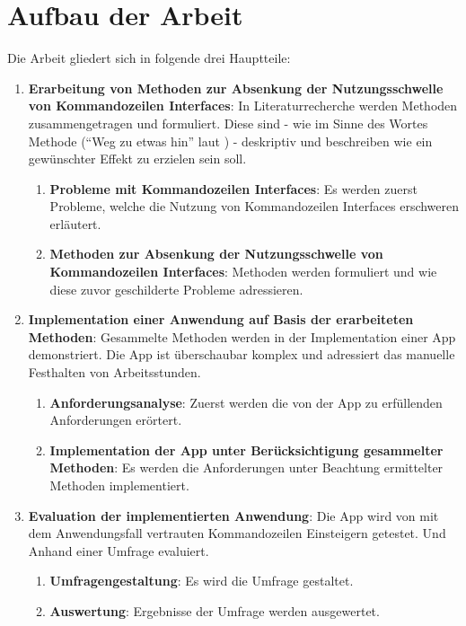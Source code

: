 \documentclass[oneside,bibliography=totocnumbered,BCOR=5mm]{scrbook}
\begin{document}
\section{Aufbau der Arbeit}

Die Arbeit gliedert sich in folgende drei Hauptteile:

\begin{enumerate}
  \item \textbf{Erarbeitung von Methoden zur Absenkung der Nutzungsschwelle von Kommandozeilen Interfaces}:
    \smallbreak
    In Literaturrecherche werden Methoden zusammengetragen und formuliert.
    Diese sind - wie im Sinne des Wortes Methode (``Weg zu etwas hin'' laut \cite{duden_methode}) - deskriptiv und beschreiben wie ein gewünschter Effekt zu erzielen sein soll.
    \begin{enumerate}
      \item \textbf{Probleme mit Kommandozeilen Interfaces}:
        \smallbreak
        Es werden zuerst Probleme, welche die Nutzung von Kommandozeilen Interfaces erschweren erläutert.
      \item \textbf{Methoden zur Absenkung der Nutzungsschwelle von Kommandozeilen Interfaces}:
        \smallbreak
        Methoden werden formuliert und wie diese zuvor geschilderte Probleme adressieren.
    \end{enumerate}

  \item \textbf{Implementation einer Anwendung auf Basis der erarbeiteten Methoden}:
    \smallbreak
    Gesammelte Methoden werden in der Implementation einer App demonstriert.
    Die App ist überschaubar komplex und adressiert das manuelle Festhalten von Arbeitsstunden.
    \begin{enumerate}
      \item \textbf{Anforderungsanalyse}:
        \smallbreak
        Zuerst werden die von der App zu erfüllenden Anforderungen erörtert.
      \item \textbf{Implementation der App unter Berücksichtigung gesammelter Methoden}:
        \smallbreak
        Es werden die Anforderungen unter Beachtung ermittelter Methoden implementiert.
    \end{enumerate}

  \item \textbf{Evaluation der implementierten Anwendung}:
    \smallbreak
    Die App wird von mit dem Anwendungsfall vertrauten Kommandozeilen Einsteigern getestet.
    Und Anhand einer Umfrage evaluiert.
    \begin{enumerate}
      \item \textbf{Umfragengestaltung}:
        \smallbreak
        Es wird die Umfrage gestaltet.
      \item \textbf{Auswertung}:
        \smallbreak
        Ergebnisse der Umfrage werden ausgewertet.
    \end{enumerate}
\end{enumerate}
\end{document}

